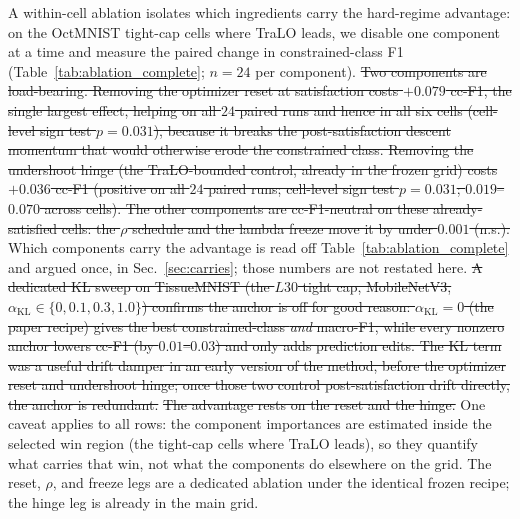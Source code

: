 \documentclass[10pt]{article}
\newcommand{\del}[1]{{\color{red}\sout{#1}}}
\begin{document}
A within-cell ablation isolates which ingredients carry the hard-regime
advantage: on the OctMNIST tight-cap cells where TraLO leads, we disable
one component at a time and measure the paired change in
constrained-class F1 (Table~\ref{tab:ablation_complete}; $n{=}24$ per
component).
\del{Two components are load-bearing. Removing the optimizer
reset at satisfaction costs \mbox{$+0.079$} cc-F1, the single largest effect,
helping on all \mbox{$24$} paired runs and hence in all six cells (cell-level
sign test \mbox{$p\!=\!0.031$}), because it breaks the post-satisfaction
descent momentum that would otherwise erode the constrained class.
Removing the undershoot hinge (the TraLO-bounded control, already in
the frozen grid) costs \mbox{$+0.036$} cc-F1 (positive on all \mbox{$24$} paired
runs; cell-level sign test \mbox{$p\!=\!0.031$}; \mbox{$0.019$--$0.070$} across cells).
The other components are cc-F1-neutral on these already-satisfied
cells: the \mbox{$\rho$} schedule and the lambda freeze move it by under \mbox{$0.001$}
(n.s.).}
{\color{blue}Which components carry the advantage is read off
Table~\ref{tab:ablation_complete} and argued once, in Sec.~\ref{sec:carries};
those numbers are not restated here.} \del{A dedicated KL sweep on TissueMNIST (the \mbox{$L30$} tight cap,
MobileNetV3, \mbox{$\alpha_{\mathrm{KL}}\!\in\!\{0,0.1,0.3,1.0\}$}) confirms the
anchor is off for good reason: \mbox{$\alpha_{\mathrm{KL}}{=}0$} (the paper
recipe) gives the best constrained-class \emph{and} macro-F1, while
every nonzero anchor lowers cc-F1 (by \mbox{$0.01$--$0.03$}) and only adds
prediction edits. The KL term was a useful drift damper in an early
version of the method, before the optimizer reset and undershoot hinge;
once those two control post-satisfaction drift directly, the anchor is
redundant.} \del{The advantage rests on the reset and the hinge.} One caveat
applies to all rows: the component importances are estimated inside the
selected win region (the tight-cap cells where TraLO leads), so they
quantify what carries that win, not what the components do elsewhere on
the grid. The reset, $\rho$, and freeze legs are a dedicated ablation
under the identical frozen recipe; the hinge leg is already in the main
grid.
\end{document}
